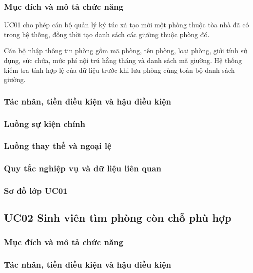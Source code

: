 \subsubsection{Mục đích và mô tả chức năng}

UC01 cho phép cán bộ quản lý ký túc xá tạo mới một phòng thuộc tòa nhà đã có trong hệ thống, đồng thời tạo danh sách các giường thuộc phòng đó.

Cán bộ nhập thông tin phòng gồm mã phòng, tên phòng, loại phòng, giới tính sử dụng, sức chứa, mức phí nội trú hằng tháng và danh sách mã giường. Hệ thống kiểm tra tính hợp lệ của dữ liệu trước khi lưu phòng cùng toàn bộ danh sách giường.

\subsubsection{Tác nhân, tiền điều kiện và hậu điều kiện}


\subsubsection{Luồng sự kiện chính}


\subsubsection{Luồng thay thế và ngoại lệ}


\subsubsection{Quy tắc nghiệp vụ và dữ liệu liên quan}


\subsubsection{Sơ đồ lớp UC01}


\subsection{UC02 Sinh viên tìm phòng còn chỗ phù hợp}

\subsubsection{Mục đích và mô tả chức năng}


\subsubsection{Tác nhân, tiền điều kiện và hậu điều kiện}


